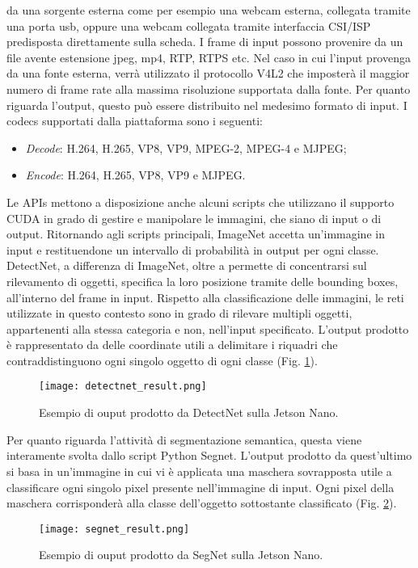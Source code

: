 da una sorgente esterna come per esempio una webcam esterna, collegata 
tramite una porta usb, oppure una webcam collegata tramite interfaccia 
CSI/ISP predisposta direttamente sulla scheda. I frame di input possono 
provenire da un file avente estensione jpeg, mp4, RTP, RTPS etc. Nel caso 
in cui l'input provenga da una fonte esterna, verrà utilizzato il protocollo 
V4L2 che imposterà il maggior numero di frame rate alla massima risoluzione 
supportata dalla fonte. Per quanto riguarda l'output, questo può 
essere distribuito nel medesimo formato di input. I codecs supportati dalla 
piattaforma sono i seguenti:
\begin{itemize}
    \item \emph{Decode}: H.264, H.265, VP8, VP9, MPEG-2, MPEG-4 e MJPEG;
    \item \emph{Encode}: H.264, H.265, VP8, VP9 e MJPEG.
\end{itemize}
Le APIs mettono a disposizione anche alcuni scripts che utilizzano il supporto 
CUDA in grado di gestire e manipolare le immagini, che siano di input o 
di output. Ritornando agli scripts principali, ImageNet accetta un'immagine 
in input e restituendone un intervallo di probabilità in output per ogni classe. 
DetectNet, a differenza di ImageNet, oltre a permette di concentrarsi sul rilevamento 
di oggetti, specifica la loro posizione tramite delle bounding boxes, 
all'interno del frame in input. Rispetto alla classificazione delle immagini, 
le reti utilizzate in questo contesto sono in grado di rilevare multipli oggetti, 
appartenenti alla stessa categoria e non, nell'input specificato. L'output 
prodotto è rappresentato da delle coordinate utili a delimitare i riquadri che 
contraddistinguono ogni singolo oggetto di ogni classe (Fig. \ref{detectnet_result}).
\begin{figure}
    \centering
    \texttt{[image: detectnet\_result.png]}
    \centering
    \caption{Esempio di ouput prodotto da DetectNet sulla Jetson Nano.}
    \label{detectnet_result}
\end{figure}
Per quanto 
riguarda l'attività di segmentazione semantica, questa viene interamente 
svolta dallo script Python Segnet. L'output prodotto da quest'ultimo si 
basa in un'immagine in cui vi è applicata una maschera sovrapposta utile a 
classificare ogni singolo pixel presente nell'immagine di input. Ogni pixel 
della maschera corrisponderà alla classe dell'oggetto sottostante classificato 
(Fig. \ref{segnet_result}).
\begin{figure}
    \centering
    \texttt{[image: segnet\_result.png]}
    \centering
    \caption{Esempio di ouput prodotto da SegNet sulla Jetson Nano.}
    \label{segnet_result}
\end{figure}
